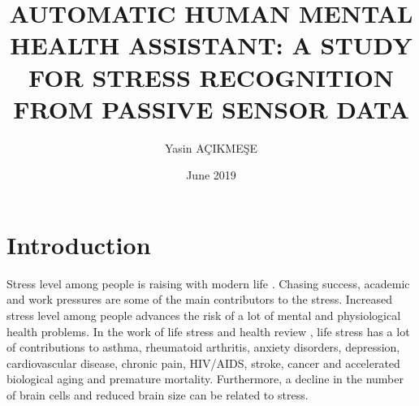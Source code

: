 \documentclass[12pt,oneandhalf,chaparabic,lfm,phd,eng,oneside,pntc]{gsufbe}
\author{Yasin AÇIKMEŞE}
\title{AUTOMATIC HUMAN MENTAL HEALTH ASSISTANT: A STUDY FOR STRESS RECOGNITION FROM PASSIVE SENSOR DATA}
\date{\normalfont June 2019}
\begin{document}
\shorthandoff{=}
\addtolength{\textheight}{1.5cm}
\newlength\myindent
\setlength\myindent{6em}
\newcommand\bindent{%
  \begingroup
  \setlength{\itemindent}{\myindent}
  \addtolength{\algorithmicindent}{\myindent}
}
\newcommand\eindent{\endgroup}

\begin{preliminaries}

\end{preliminaries}
%
%
%
\newtheorem{thm}{Definition}[chapter]
\renewcommand{\thethm}{\arabic{chapter}.\arabic{thm}}
\newtheorem{prp}{Proposition}[chapter]
\renewcommand{\theprp}{\arabic{chapter}.\arabic{prp}}
\newenvironment{prf}{\noindent{\bf Proof}}{$\hfill \Box$ \vspace{10pt}}

\chapter{Introduction}
\label{chap:Introduction}
Stress level among people is raising with modern life \cite{weiten2014psychology}. Chasing success, academic and work pressures are some of the main contributors to the stress. Increased stress level among people advances the risk of a lot of mental and physiological health problems. In the work of life stress and health review \cite{slavich2016life}, life stress has a lot of contributions to asthma, rheumatoid arthritis, anxiety disorders, depression, cardiovascular disease, chronic pain, HIV/AIDS, stroke, cancer and accelerated biological aging and premature mortality. Furthermore, a decline in the number of brain cells and reduced brain size \cite{kang2012decreased} can be related to stress. 
\end{document}
